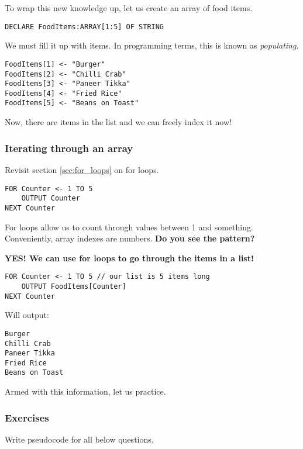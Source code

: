 \documentclass[./main.tex]{subfiles}
\begin{document}
To wrap this new knowledge up, let us create an array of food items.

\begin{verbatim}
DECLARE FoodItems:ARRAY[1:5] OF STRING
\end{verbatim}

We must fill it up with items. In programming terms, this is known as \emph{populating}.

\begin{verbatim}
FoodItems[1] <- "Burger"
FoodItems[2] <- "Chilli Crab"
FoodItems[3] <- "Paneer Tikka"
FoodItems[4] <- "Fried Rice"
FoodItems[5] <- "Beans on Toast"
\end{verbatim}

Now, there are items in the list and we can freely index it now!

\subsubsection{Iterating through an array}

Revisit section \ref{sec:for_loops} on for loops.

\begin{verbatim}
FOR Counter <- 1 TO 5
    OUTPUT Counter
NEXT Counter
\end{verbatim}

For loops allow us to count through values between 1 and something. Conveniently, array indexes are numbers. \textbf{Do you see the pattern?}

\textbf{YES! We can use for loops to go through the items in a list!}

\begin{verbatim}
FOR Counter <- 1 TO 5 // our list is 5 items long
    OUTPUT FoodItems[Counter]
NEXT Counter
\end{verbatim}

Will output:

\begin{verbatim}
Burger
Chilli Crab
Paneer Tikka
Fried Rice
Beans on Toast
\end{verbatim}

Armed with this information, let us practice.

\newpage
\subsubsection{Exercises}

Write pseudocode for all below questions.
\end{document}
